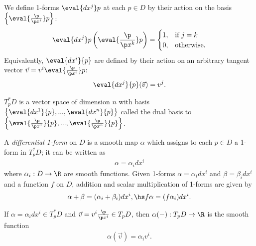 \documentclass{article}
\begin{document}
\begin{definition}
    We define 1-forms $\eval{dx^j}p$ at each $p\in D$ by their action on the basis
    $\left\lbrace\eval{\frac{\p }{\p x^i}}p\right\rbrace$:
    \begin{align*}
        \eval{dx^j}p\left(\eval{\frac{\p }{\p x^k}}p\right)= \begin{cases}
            1, &\text{if } j = k\\
            0, &\text{otherwise}.
        \end{cases}
    \end{align*}
    Equivalently, $\eval{dx^i}{p}$ are defined by their action on an arbitrary tangent vector
    $\vec v = v^i\eval{\frac{\p }{\p x^i}}p$:
    \begin{align*}
        \eval{dx^j}{p}(\vec v) = v^j.
    \end{align*}
\end{definition}

\begin{lemma}
    $T_p^*D$ is a vector space of dimension $n$ with basis 
    $\left\lbrace \eval{dx^1}{p},...,\eval{dx^n}{p}\right\rbrace$ called the dual basis to
    $\left\lbrace \eval{\frac{\p }{\p x^1}}{p}, ..., \eval{\frac{\p }{\p x^n}}{p}\right\rbrace$.
\end{lemma}

\begin{definition}
    A \emph{differential 1-form} on $D$ is a smooth map $\alpha$ which assigns to each $p\in D$
    a 1-form in $T^*_pD$; it can be written as
    \begin{align*}
        \alpha = \alpha_i dx^i
    \end{align*}
    where $\alpha_i:D\to\R$ are smooth functions. Given 1-forms $\alpha=\alpha_idx^i$ and 
    $\beta=\beta_idx^i$ and a function $f$ on $D$, addition and scalar multiplication of 
    1-forms are given by
    \begin{align*}
        \alpha + \beta = (\alpha_i + \beta_i)dx^i,\hs f\alpha = (f\alpha_i)dx^i.
    \end{align*}
\end{definition}

\begin{lemma}[Notes 4.16]
    If $\alpha=\alpha_i dx^i\in T_p^*D$ and $\vec v=v^i\frac{\p }{\p x^i}\in T_pD$,
    then $\alpha(-):T_pD\to\R$ is the smooth function
    \begin{align*}
        \alpha(\vec v) = \alpha_i v^i.    
    \end{align*}
\end{lemma}
\end{document}
